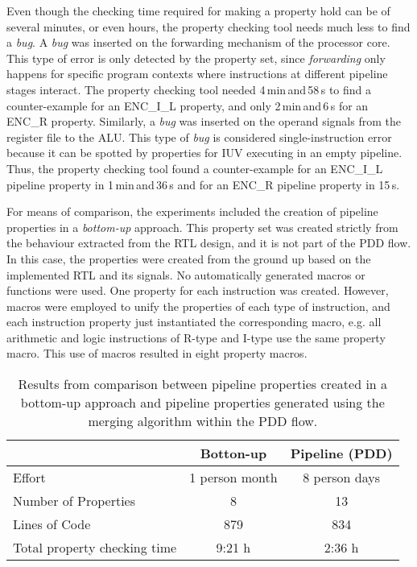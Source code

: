 Even though the checking time required for making a property hold can be of several minutes, or even hours, the property checking tool needs much less to find a \textit{bug}. A \textit{bug} was inserted on the forwarding mechanism of the processor core. This type of error is only detected by the \SSQED{} property set, since \textit{forwarding} only happens for specific program contexts where instructions at different pipeline stages interact. The property checking tool needed 4\,min\,and\,58\,s to find a counter-example for an ENC\_I\_L \SSQED{} property, and only 2\,min\,and\,6\,s for an ENC\_R \SSQED{} property. Similarly, a \textit{bug} was inserted on the operand signals from the register file to the ALU. This type of \textit{bug} is considered single-instruction error because it can be spotted by properties for IUV executing in an empty pipeline. Thus, the property checking tool found a counter-example for an ENC\_I\_L pipeline property in 1\,min\,and\,36\,s and for an ENC\_R pipeline property in 15\,s.

For means of comparison, the experiments included the creation of pipeline properties in a \textit{bottom-up} approach. This property set was created strictly from the behaviour extracted from the RTL design, and it is not part of the PDD flow. In this case, the properties were created from the ground up based on the implemented RTL and its signals. No automatically generated macros or functions were used. One property for each instruction was created. However, macros were employed to unify the properties of each type of instruction, and each instruction property just instantiated the corresponding macro, e.g. all arithmetic and logic instructions of R-type and I-type use the same property macro. This use of macros resulted in eight property macros.

\begin{table*}[htb!] 
	\centering 
	\caption{Results from comparison between pipeline properties created in a bottom-up approach and pipeline properties generated using the merging algorithm within the PDD flow.} 
	\label{tab:bottom-up-ppt-resutls}
	\begin{tabular}{p{5cm} c c} 
		  &  \textbf{Botton-up} & \textbf{Pipeline (PDD)} \\     
		\hline	
		Effort  &  1 person month &  8 person days\\
		Number of Properties  &  8 & 13 \\
		Lines of Code  & 879  &  834\\
		Total property checking time  & 9:21 h  & 2:36 h \\
	\end{tabular}
\end{table*}

